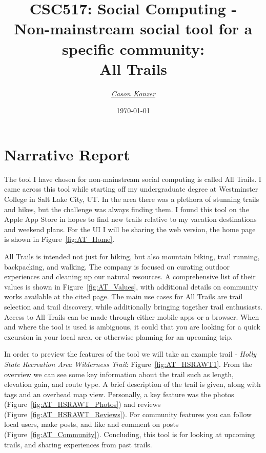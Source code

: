 \documentclass[12pt]{article}
\newcommand{\XB}{\color{black}}
\newcommand{\XV}{\color{violet}}
\begin{document}
\title{\textbf{CSC517}: Social Computing - \\ Non-mainstream social tool for a specific community: \\ All Trails}
\date{\today}
\author{\XV\textit{\large{\href{https://github.com/casonk}{Cason Konzer}}}\XB}

\maketitle
\hrulefill
\vfill 

\pagebreak

\tableofcontents
\listoffigures

\newpage

\section{Narrative Report}
The tool I have chosen for non-mainstream social computing is called All Trails.
I came across this tool while starting off my undergraduate degree at Westminster College in Salt Lake City, UT. 
In the area there was a plethora of stunning trails and hikes, but the challenge was always finding them. 
I found this tool on the Apple App Store in hopes to find new trails relative to my vacation destinations and weekend plans. 
For the UI I will be sharing the web version, the home page is shown in Figure~\ref{fig:AT_Home}. 

All Trails is intended not just for hiking, but also mountain biking, trail running, backpacking, and walking. 
The company is focused on curating outdoor experiences and cleaning up our natural resources.
A comprehensive list of their values is shown in Figure~\ref{fig:AT_Values}, with additional details on community works available at the cited page. 
The main use cases for All Trails are trail selection and trail discovery, while additionally bringing together trail enthusiasts. 
Access to All Trails can be made through either mobile apps or a browser. 
When and where the tool is used is ambiguous, it could that you are looking for a quick excursion in your local area, or otherwise planning for an upcoming trip. 

In order to preview the features of the tool we will take an example trail - \emph{Holly State Recreation Area Wilderness Trail}: Figure~\ref{fig:AT_HSRAWT1}.
From the overview we can see some key information about the trail such as length, elevation gain, and route type. 
A brief description of the trail is given, along with tags and an overhead map view. 
Personally, a key feature was the photos (Figure~\ref{fig:AT_HSRAWT_Photos}) and reviews (Figure~\ref{fig:AT_HSRAWT_Reviews}). 
For community features you can follow local users, make posts, and like and comment on posts (Figure~\ref{fig:AT_Community}). 
Concluding, this tool is for looking at upcoming trails, and sharing experiences from past trails. 
\end{document}
